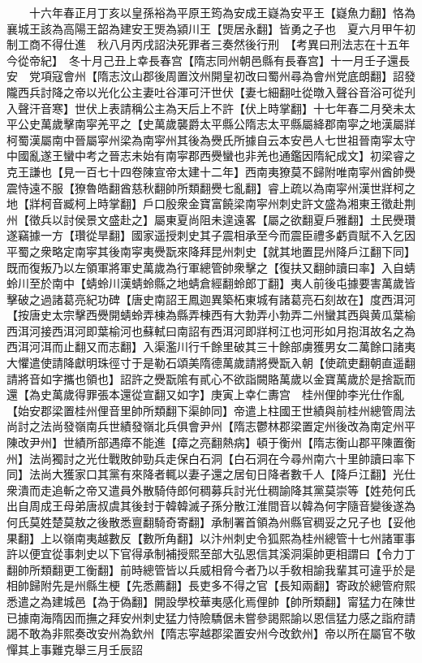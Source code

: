 　　十六年春正月丁亥以皇孫裕為平原王筠為安成王嶷為安平王【嶷魚力翻】恪為襄城王該為高陽王韶為建安王煚為潁川王【煚居永翻】皆勇之子也　夏六月甲午初制工商不得仕進　秋八月丙戌詔決死罪者三奏然後行刑　【考異曰刑法志在十五年今從帝紀】　冬十月己丑上幸長春宫【隋志同州朝邑縣有長春宫】十一月壬子還長安　党項寇會州【隋志汶山郡後周置汶州開皇初改曰蜀州尋為會州党底朗翻】詔發隴西兵討降之帝以光化公主妻吐谷渾可汗世伏【妻七細翻吐從暾入聲谷音浴可從刋入聲汗音寒】世伏上表請稱公主為天后上不許【伏上時掌翻】十七年春二月癸未太平公史萬歲擊南寜羌平之【史萬歲襲爵太平縣公隋志太平縣屬絳郡南寜之地漢屬牂柯蜀漢屬南中晉屬寜州梁為南寜州其後為㸑氏所據自云本安邑人七世祖晉南寜太守中國亂遂王蠻中考之晉志未始有南寜郡西㸑蠻也非羌也通鑑因隋紀成文】初梁睿之克王謙也【見一百七十四卷陳宣帝太建十二年】西南夷獠莫不歸附唯南寜州酋帥㸑震恃遠不服【獠魯皓翻酋慈秋翻帥所類翻㸑七亂翻】睿上疏以為南寜州漢世牂柯之地【牂柯音臧柯上時掌翻】戶口殷衆金寶富饒梁南寜州刺史許文盛為湘東王徵赴荆州【徵兵以討侯景文盛赴之】屬東夏尚阻未遑遠畧【屬之欲翻夏戶雅翻】土民㸑瓚遂竊據一方【瓚從旱翻】國家遥授刺史其子震相承至今而震臣禮多虧貢賦不入乞因平蜀之衆略定南寜其後南寜夷㸑翫來降拜昆州刺史【就其地置昆州降戶江翻下同】既而復叛乃以左領軍將軍史萬歲為行軍總管帥衆擊之【復扶又翻帥讀曰率】入自蜻蛉川至於南中【蜻蛉川漢蜻蛉縣之地蜻倉經翻蛉郎丁翻】夷人前後屯據要害萬歲皆擊破之過諸葛亮紀功碑【唐史南詔王鳳迦異築柘東城有諸葛亮石刻故在】度西洱河【按唐史太宗擊西㸑開蜻蛉弄棟為縣弄棟西有大勃弄小勃弄二州蠻其西與黄瓜葉榆西洱河接西洱河即葉榆河也蘇軾曰南詔有西洱河即牂柯江也河形如月抱洱故名之為西洱河洱而止翻又而志翻】入渠濫川行千餘里破其三十餘部虜獲男女二萬餘口諸夷大懼遣使請降獻明珠徑寸于是勒石頌美隋德萬歲請將㸑翫入朝【使疏吏翻朝直遥翻請將音如字攜也領也】詔許之㸑翫隂有貳心不欲詣闕賂萬歲以金寶萬歲於是捨翫而還【為史萬歲得罪張本還從宣翻又如字】庚寅上幸仁夀宫　桂州俚帥李光仕作亂【始安郡梁置桂州俚音里帥所類翻下渠帥同】帝遣上柱國王世績與前桂州總管周法尚討之法尚發嶺南兵世績發嶺北兵俱會尹州【隋志鬱林郡梁置定州後改為南定州平陳改尹州】世績所部遇瘴不能進【瘴之亮翻熱病】頓于衡州【隋志衡山郡平陳置衡州】法尚獨討之光仕戰敗帥勁兵走保白石洞【白石洞在今尋州南六十里帥讀曰率下同】法尚大獲家口其黨有來降者輒以妻子還之居旬日降者數千人【降戶江翻】光仕衆潰而走追斬之帝又遣員外散騎侍郎何稠募兵討光仕稠諭降其黨莫崇等【姓苑何氏出自周成王母弟唐叔虞其後封于韓韓滅子孫分散江淮間音以韓為何字隨音變後遂為何氏莫姓楚莫敖之後散悉亶翻騎奇寄翻】承制署首領為州縣官稠妥之兄子也【妥他果翻】上以嶺南夷越數反【數所角翻】以汴州刺史令狐熙為桂州總管十七州諸軍事許以便宜從事刺史以下官得承制補授熙至部大弘恩信其溪洞渠帥更相謂曰【令力丁翻帥所類翻更工衡翻】前時總管皆以兵威相脅今者乃以手敎相諭我輩其可違乎於是相帥歸附先是州縣生梗【先悉薦翻】長吏多不得之官【長知兩翻】寄政於總管府熙悉遣之為建城邑【為于偽翻】開設學校華夷感化焉俚帥【帥所類翻】甯猛力在陳世已據南海隋因而撫之拜安州刺史猛力恃險驕倨未嘗參謁熙諭以恩信猛力感之詣府請謁不敢為非熙奏改安州為欽州【隋志寜越郡梁置安州今改欽州】帝以所在屬官不敬憚其上事難克舉三月壬辰詔

